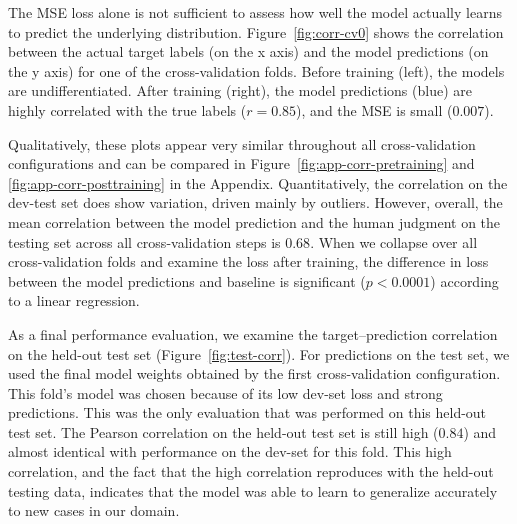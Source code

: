 \documentclass[11pt,a4paper]{article}
\begin{document}
The MSE loss alone is not sufficient to assess how well the model actually learns to predict the underlying distribution. Figure~\ref{fig:corr-cv0} shows the correlation between the actual target labels (on the x axis) and the model predictions (on the y axis) for one of the cross-validation folds. Before training (left), the models are undifferentiated. After training (right), the model predictions (blue) are highly correlated with the true labels ($r=0.85$), and the MSE is small ($0.007$).

Qualitatively, these plots appear very similar throughout all cross-validation configurations and can be compared in Figure~\ref{fig:app-corr-pretraining} and \ref{fig:app-corr-posttraining} in the Appendix. Quantitatively, the correlation on the dev-test set does show variation, driven mainly by outliers.
However, overall, the mean correlation between the model prediction and the human judgment on the testing set across all cross-validation steps is $0.68$. When we collapse over all cross-validation folds and examine the loss after training, the difference in loss between the model predictions and baseline is significant ($p<0.0001$) according to a linear regression.

As a final performance evaluation, we examine the target--prediction correlation on the held-out test set (Figure~\ref{fig:test-corr}). For predictions on the test set, we used the final model weights obtained by the first cross-validation configuration. This fold's model was chosen because of its low dev-set loss and strong predictions. This was the only evaluation that was performed on this held-out test set. The Pearson correlation on the held-out test set is still high ($0.84$) and almost identical with performance on the dev-set for this fold. This high correlation, and the fact that the high correlation reproduces with the held-out testing data, indicates that the model was able to learn to generalize accurately to new cases in our domain.
\end{document}
